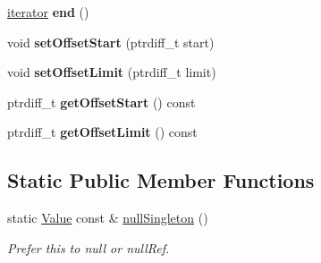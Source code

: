\begin{DoxyCompactItemize}
\mbox{\label{classJson_1_1Value_a2f961eff73f7f79cd29260b6cbd42558}} 
\hyperlink{classJson_1_1ValueIterator}{iterator} {\bfseries end} ()
\item 
\mbox{\label{classJson_1_1Value_a92e32ea0f4f8a15853a3cf0beac9feb9}} 
void {\bfseries set\+Offset\+Start} (ptrdiff\+\_\+t start)
\item 
\mbox{\label{classJson_1_1Value_a5e4f5853fec138150c5df6004a8c2bcf}} 
void {\bfseries set\+Offset\+Limit} (ptrdiff\+\_\+t limit)
\item 
\mbox{\label{classJson_1_1Value_afa081dc764000951a1d8d6148155508e}} 
ptrdiff\+\_\+t {\bfseries get\+Offset\+Start} () const
\item 
\mbox{\label{classJson_1_1Value_a2cdfa01935f87fcace90d450cbd2c0a4}} 
ptrdiff\+\_\+t {\bfseries get\+Offset\+Limit} () const
\end{DoxyCompactItemize}
\subsection*{Static Public Member Functions}
\begin{DoxyCompactItemize}
\item 
\mbox{\label{classJson_1_1Value_af2f124567acc35d021a424e53ebdfcab}} 
static \hyperlink{classJson_1_1Value}{Value} const  \& \hyperlink{classJson_1_1Value_af2f124567acc35d021a424e53ebdfcab}{null\+Singleton} ()
\begin{DoxyCompactList}\small\item\em Prefer this to null or null\+Ref. \end{DoxyCompactList}\end{DoxyCompactItemize}
